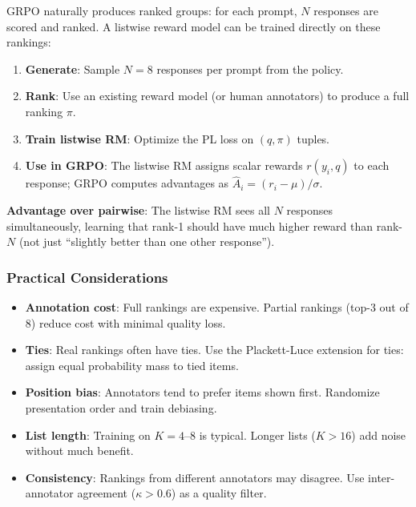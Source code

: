 \begin{keybox}
GRPO naturally produces ranked groups: for each prompt, $N$ responses are scored and ranked. A listwise reward model can be trained directly on these rankings:

\begin{enumerate}
  \item \textbf{Generate}: Sample $N=8$ responses per prompt from the policy.
  \item \textbf{Rank}: Use an existing reward model (or human annotators) to produce a full ranking $\pi$.
  \item \textbf{Train listwise RM}: Optimize the PL loss on $(q, \pi)$ tuples.
  \item \textbf{Use in GRPO}: The listwise RM assigns scalar rewards $r(y_i, q)$ to each response; GRPO computes advantages as $\hat{A}_i = (r_i - \mu) / \sigma$.
\end{enumerate}

\textbf{Advantage over pairwise}: The listwise RM sees all $N$ responses simultaneously, learning that rank-1 should have much higher reward than rank-$N$ (not just ``slightly better than one other response'').
\end{keybox}

\subsubsection*{Practical Considerations}
\label{practical-considerations}

\begin{warningbox}
\begin{itemize}
  \item \textbf{Annotation cost}: Full rankings are expensive. Partial rankings (top-3 out of 8) reduce cost with minimal quality loss.
  \item \textbf{Ties}: Real rankings often have ties. Use the Plackett-Luce extension for ties: assign equal probability mass to tied items.
  \item \textbf{Position bias}: Annotators tend to prefer items shown first. Randomize presentation order and train debiasing.
  \item \textbf{List length}: Training on $K=4$--8 is typical. Longer lists ($K>16$) add noise without much benefit.
  \item \textbf{Consistency}: Rankings from different annotators may disagree. Use inter-annotator agreement ($\kappa > 0.6$) as a quality filter.
\end{itemize}
\end{warningbox}

